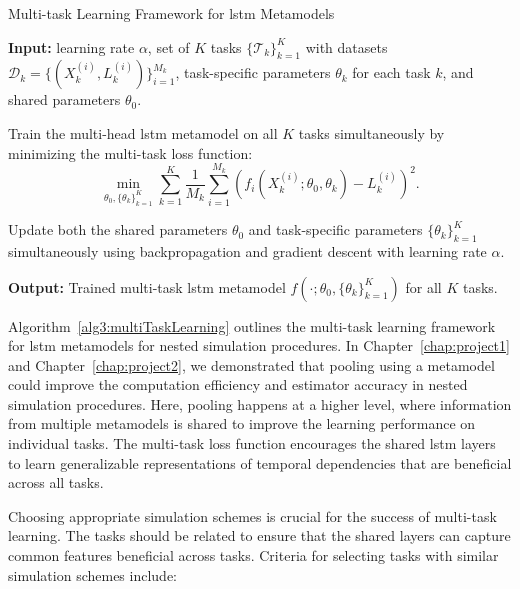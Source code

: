 \begin{algorithm}
    \caption{Multi-task Learning Framework for \gls{lstm} Metamodels}
    \begin{algorithmic}[1] \label{alg3:multiTaskLearning}
        \STATE \textbf{Input:} learning rate $\alpha$, set of $K$ tasks $\{\mathcal{T}_k\}_{k=1}^K$ with datasets $\mathcal{D}_k = \{(X_k^{(i)}, L_k^{(i)})\}_{i=1}^{M_k}$, task-specific parameters $\theta_k$ for each task $k$, and shared parameters $\theta_0$.
    
        \STATE Train the multi-head \gls{lstm} metamodel on all $K$ tasks simultaneously by minimizing the multi-task loss function:
        \begin{equation} \label{eq3:multiTaskLoss}
            \min_{\theta_0, \{\theta_k\}_{k=1}^K} \sum_{k=1}^K \frac{1}{M_k} \sum_{i=1}^{M_k} \left( f_i(X_k^{(i)}; \theta_0, \theta_k) - L_k^{(i)} \right)^2.
        \end{equation}
    
        \STATE Update both the shared parameters $\theta_0$ and task-specific parameters $\{\theta_k\}_{k=1}^K$ simultaneously using backpropagation and gradient descent with learning rate $\alpha$.
        
        \STATE \textbf{Output:} Trained multi-task \gls{lstm} metamodel $f(\cdot; \theta_0, \{\theta_k\}_{k=1}^K)$ for all $K$ tasks.
    \end{algorithmic}
\end{algorithm}

Algorithm~\ref{alg3:multiTaskLearning} outlines the multi-task learning framework for \gls{lstm} metamodels for nested simulation procedures.
In Chapter~\ref{chap:project1} and Chapter~\ref{chap:project2}, we demonstrated that pooling using a metamodel could improve the computation efficiency and estimator accuracy in nested simulation procedures.
Here, pooling happens at a higher level, where information from multiple metamodels is shared to improve the learning performance on individual tasks.
The multi-task loss function encourages the shared \gls{lstm} layers to learn generalizable representations of temporal dependencies that are beneficial across all tasks.

Choosing appropriate simulation schemes is crucial for the success of multi-task learning. 
The tasks should be related to ensure that the shared layers can capture common features beneficial across tasks. 
Criteria for selecting tasks with similar simulation schemes include:

